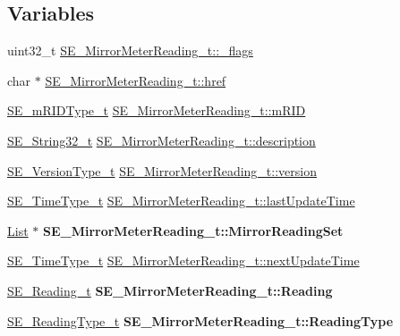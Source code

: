 \subsection*{Variables}
\begin{DoxyCompactItemize}
\item 
uint32\+\_\+t \hyperlink{group__MirrorMeterReading_gabcc4d1dbd86cc1a59a5239a676c92dbd}{S\+E\+\_\+\+Mirror\+Meter\+Reading\+\_\+t\+::\+\_\+flags}
\item 
char $\ast$ \hyperlink{group__MirrorMeterReading_ga708f7129eb6e118a8d938112b6417c62}{S\+E\+\_\+\+Mirror\+Meter\+Reading\+\_\+t\+::href}
\item 
\hyperlink{group__mRIDType_gac74622112f3a388a2851b2289963ba5e}{S\+E\+\_\+m\+R\+I\+D\+Type\+\_\+t} \hyperlink{group__MirrorMeterReading_ga3848167c7a5f04fcb8cefac37960ee92}{S\+E\+\_\+\+Mirror\+Meter\+Reading\+\_\+t\+::m\+R\+ID}
\item 
\hyperlink{group__String32_gac9f59b06b168b4d2e0d45ed41699af42}{S\+E\+\_\+\+String32\+\_\+t} \hyperlink{group__MirrorMeterReading_ga959c2527270a7004344e91b2dbe90811}{S\+E\+\_\+\+Mirror\+Meter\+Reading\+\_\+t\+::description}
\item 
\hyperlink{group__VersionType_ga4b8d27838226948397ed99f67d46e2ae}{S\+E\+\_\+\+Version\+Type\+\_\+t} \hyperlink{group__MirrorMeterReading_gac080719eb59601dcaf5e053c111f3744}{S\+E\+\_\+\+Mirror\+Meter\+Reading\+\_\+t\+::version}
\item 
\hyperlink{group__TimeType_ga6fba87a5b57829b4ff3f0e7638156682}{S\+E\+\_\+\+Time\+Type\+\_\+t} \hyperlink{group__MirrorMeterReading_ga115c89d7cc44634e378828a2b26f213f}{S\+E\+\_\+\+Mirror\+Meter\+Reading\+\_\+t\+::last\+Update\+Time}
\item 
\mbox{\label{group__MirrorMeterReading_gad1c36445880a05a15c34c7977c11b34a}} 
\hyperlink{structList}{List} $\ast$ {\bfseries S\+E\+\_\+\+Mirror\+Meter\+Reading\+\_\+t\+::\+Mirror\+Reading\+Set}
\item 
\hyperlink{group__TimeType_ga6fba87a5b57829b4ff3f0e7638156682}{S\+E\+\_\+\+Time\+Type\+\_\+t} \hyperlink{group__MirrorMeterReading_ga2d98cafe8eb774641dd6798ade23d9ee}{S\+E\+\_\+\+Mirror\+Meter\+Reading\+\_\+t\+::next\+Update\+Time}
\item 
\mbox{\label{group__MirrorMeterReading_ga64a1cb6e75bc9453743ab0682e0b568f}} 
\hyperlink{structSE__Reading__t}{S\+E\+\_\+\+Reading\+\_\+t} {\bfseries S\+E\+\_\+\+Mirror\+Meter\+Reading\+\_\+t\+::\+Reading}
\item 
\mbox{\label{group__MirrorMeterReading_ga068945671c507d59b16f67cc870e257f}} 
\hyperlink{structSE__ReadingType__t}{S\+E\+\_\+\+Reading\+Type\+\_\+t} {\bfseries S\+E\+\_\+\+Mirror\+Meter\+Reading\+\_\+t\+::\+Reading\+Type}
\end{DoxyCompactItemize}


